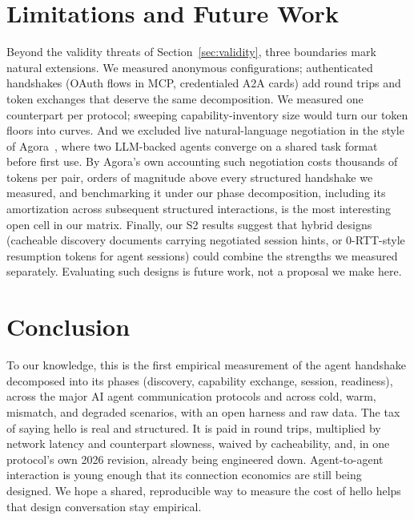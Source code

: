 \documentclass[10pt]{article}
\begin{document}
\section{Limitations and Future Work}
\label{sec:limitations}


Beyond the validity threats of Section~\ref{sec:validity}, three
boundaries mark natural extensions. We measured anonymous configurations;
authenticated handshakes (OAuth flows in MCP, credentialed A2A cards) add
round trips and token exchanges that deserve the same decomposition. We
measured one counterpart per protocol; sweeping capability-inventory size
would turn our token floors into curves. And we excluded live
natural-language negotiation in the style of
Agora~\citep{marro2024agora}, where two LLM-backed agents converge on a
shared task format before first use. By Agora's own accounting such
negotiation costs thousands of tokens per pair, orders of magnitude above
every structured handshake we measured, and benchmarking it under our
phase decomposition, including its amortization across subsequent
structured interactions, is the most interesting open cell in our matrix.
Finally, our S2 results suggest that hybrid designs (cacheable discovery
documents carrying negotiated session hints, or 0-RTT-style resumption
tokens for agent sessions) could combine the strengths we measured
separately. Evaluating such designs is future work, not a proposal we
make here.


\section{Conclusion}
\label{sec:conclusion}


To our knowledge, this is the first empirical measurement of the agent
handshake decomposed into its phases (discovery, capability exchange,
session, readiness), across the major AI agent communication protocols
and across cold, warm, mismatch, and degraded scenarios, with an open
harness and raw data. The tax of saying hello is real and structured. It is paid in round
trips, multiplied by network latency and counterpart slowness, waived by
cacheability, and, in one protocol's own 2026 revision, already being
engineered down. Agent-to-agent interaction is young enough that its
connection economics are still being designed. We hope a shared,
reproducible way to measure the cost of hello helps that design
conversation stay empirical.
\end{document}
